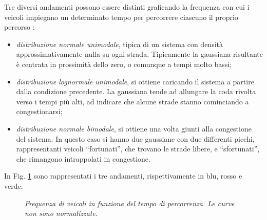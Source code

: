 Tre diversi andamenti possono essere distinti graficando la frequenza con cui i veicoli impiegano un determinato tempo per percorrere ciascuno il proprio percorso \cite{TravelTime}:
\begin{itemize}
    \item \emph{distribuzione normale unimodale}, tipica di un sistema con densit\`a approssimativamente nulla su ogni strada.
        Tipicamente la gaussiana risultante \`e centrata in prossimit\`a dello zero, o comunque a tempi molto bassi;
    \item \emph{distribuzione lognormale unimodale}, si ottiene caricando il sistema a partire dalla condizione precedente.
        La gaussiana tende ad allungare la coda rivolta verso i tempi pi\`u alti, ad indicare che alcune strade stanno cominciando a congestionarsi;
    \item \emph{distribuzione normale bimodale}, si ottiene una volta giunti alla congestione del sistema.
        In questo caso si hanno due gaussiane con due differenti picchi, rappresentanti veicoli ``fortunati'', che trovano le strade libere, e ``sfortunati'', che rimangono intrappolati in congestione.
\end{itemize}
In Fig. \ref{fig:frequency_distributions} sono rappresentati i tre andamenti, rispettivamente in blu, rosso e verde.
\begin{figure}[H]
    \centering
    \caption[Frequenza di veicoli in funzione del tempo di percorrenza]{\emph{Frequenza di veicoli in funzione del tempo di percorrenza. Le curve non sono normalizzate.}}
    \label{fig:frequency_distributions}
\end{figure}

